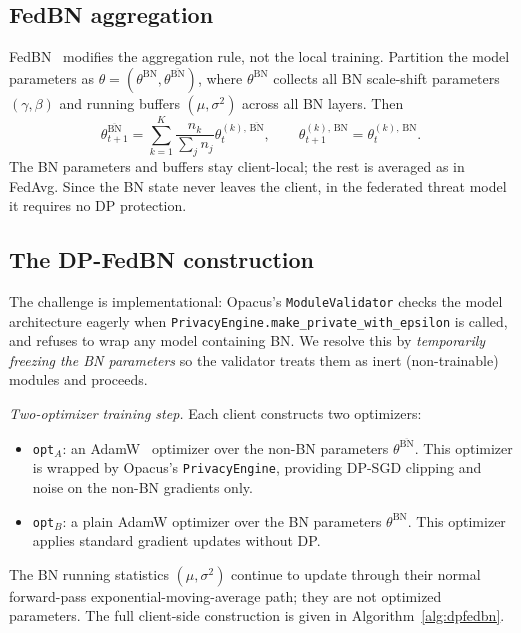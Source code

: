 \documentclass[conference]{IEEEtran}
\newcommand{\code}[1]{\texttt{\small #1}}
\begin{document}
\subsection{FedBN aggregation}
FedBN~\cite{fedbn} modifies the aggregation rule, not the local training. Partition the model parameters as $\theta = (\theta^{\mathrm{BN}}, \theta^{\overline{\mathrm{BN}}})$, where $\theta^{\mathrm{BN}}$ collects all BN scale-shift parameters $(\gamma, \beta)$ and running buffers $(\mu, \sigma^2)$ across all BN layers. Then
\begin{equation}
\theta_{t+1}^{\overline{\mathrm{BN}}} = \sum_{k=1}^{K} \frac{n_k}{\sum_j n_j} \theta_t^{(k),\,\overline{\mathrm{BN}}}, \qquad
\theta_{t+1}^{(k),\,\mathrm{BN}} = \theta_t^{(k),\,\mathrm{BN}}.
\label{eq:fedbn}
\end{equation}
The BN parameters and buffers stay client-local; the rest is averaged as in FedAvg. Since the BN state never leaves the client, in the federated threat model it requires no DP protection.

\subsection{The DP-FedBN construction}
The challenge is implementational: Opacus's \code{ModuleValidator} checks the model architecture eagerly when \code{PrivacyEngine.make\_private\_with\_epsilon} is called, and refuses to wrap any model containing BN. We resolve this by \emph{temporarily freezing the BN parameters} so the validator treats them as inert (non-trainable) modules and proceeds.

\emph{Two-optimizer training step.} Each client constructs two optimizers:
\begin{itemize}
\item \code{opt$_A$}: an AdamW~\cite{adamw} optimizer over the non-BN parameters $\theta^{\overline{\mathrm{BN}}}$. This optimizer is wrapped by Opacus's \code{PrivacyEngine}, providing DP-SGD clipping and noise on the non-BN gradients only.
\item \code{opt$_B$}: a plain AdamW optimizer over the BN parameters $\theta^{\mathrm{BN}}$. This optimizer applies standard gradient updates without DP.
\end{itemize}
The BN running statistics $(\mu, \sigma^2)$ continue to update through their normal forward-pass exponential-moving-average path; they are not optimized parameters. The full client-side construction is given in Algorithm~\ref{alg:dpfedbn}.
\end{document}
